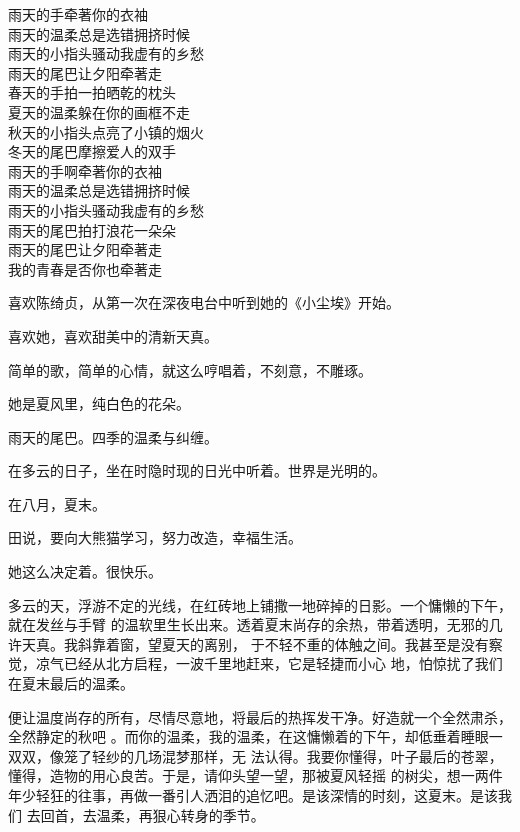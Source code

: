 \documentclass[12pt,a4paper]{article}
\begin{document}
		\longpoem{}{}{}
		雨天的手牵著你的衣袖 \\
		雨天的温柔总是选错拥挤时候 \\
		雨天的小指头骚动我虚有的乡愁 \\
		雨天的尾巴让夕阳牵著走 \\
		春天的手拍一拍晒乾的枕头 \\
		夏天的温柔躲在你的画框不走 \\
		秋天的小指头点亮了小镇的烟火 \\
		冬天的尾巴摩擦爱人的双手 \\
		雨天的手啊牵著你的衣袖 \\
		雨天的温柔总是选错拥挤时候 \\
		雨天的小指头骚动我虚有的乡愁 \\
		雨天的尾巴拍打浪花一朵朵 \\
		雨天的尾巴让夕阳牵著走 \\
		我的青春是否你也牵著走
		\endlongpoem


		喜欢陈绮贞，从第一次在深夜电台中听到她的《小尘埃》开始。\par
		喜欢她，喜欢甜美中的清新天真。\par
		简单的歌，简单的心情，就这么哼唱着，不刻意，不雕琢。\par
		她是夏风里，纯白色的花朵。

		雨天的尾巴。四季的温柔与纠缠。\par
		在多云的日子，坐在时隐时现的日光中听着。世界是光明的。\par
		在八月，夏末。

		田说，要向大熊猫学习，努力改造，幸福生活。\par
		她这么决定着。很快乐。

	\endwriting



		多云的天，浮游不定的光线，在红砖地上铺撒一地碎掉的日影。一个慵懒的下午，就在发丝与手臂
	的温软里生长出来。透着夏末尚存的余热，带着透明，无邪的几许天真。我斜靠着窗，望夏天的离别，
	于不轻不重的体触之间。我甚至是没有察觉，凉气已经从北方启程，一波千里地赶来，它是轻捷而小心
	地，怕惊扰了我们在夏末最后的温柔。

		便让温度尚存的所有，尽情尽意地，将最后的热挥发干净。好造就一个全然肃杀，全然静定的秋吧
	。而你的温柔，我的温柔，在这慵懒着的下午，却低垂着睡眼一双双，像笼了轻纱的几场混梦那样，无
	法认得。我要你懂得，叶子最后的苍翠，懂得，造物的用心良苦。于是，请仰头望一望，那被夏风轻摇
	的树尖，想一两件年少轻狂的往事，再做一番引人洒泪的追忆吧。是该深情的时刻，这夏末。是该我们
	去回首，去温柔，再狠心转身的季节。
\end{document}
